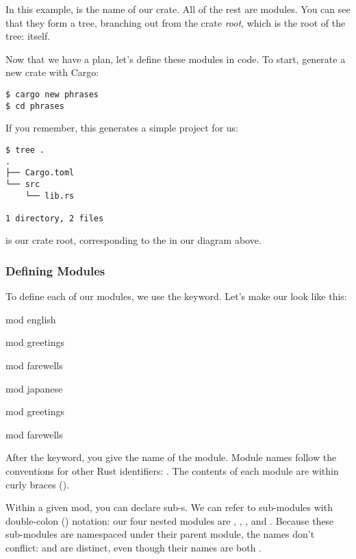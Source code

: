 In this example,  is the name of our crate. All of the rest are modules. You can see that they form a tree, branching out 
from the crate \emph{root}, which is the root of the tree:  itself.

\blank

Now that we have a plan, let's define these modules in code. To start, generate a new crate with Cargo:

\begin{verbatim}
$ cargo new phrases
$ cd phrases
\end{verbatim}

If you remember, this generates a simple project for us:

\begin{verbatim}
$ tree .
.
├── Cargo.toml
└── src
    └── lib.rs

1 directory, 2 files
\end{verbatim}

 is our crate root, corresponding to the  in our diagram above.

\subsubsection*{Defining Modules}

To define each of our modules, we use the  keyword. Let's make our  look like this:

\begin{rustc}
mod english {
    mod greetings {
    }

    mod farewells {
    }
}

mod japanese {
    mod greetings {
    }

    mod farewells {
    }
}
\end{rustc}

After the  keyword, you give the name of the module. Module names follow the conventions for other Rust identifiers: 
. The contents of each module are within curly braces (\code{\{\}}).

\blank

Within a given mod, you can declare sub-s. We can refer to sub-modules with double-colon (\code{::}) notation: our four 
nested modules are , , , and . 
Because these sub-modules are namespaced under their parent module, the names don't conflict:  and 
 are distinct, even though their names are both .

